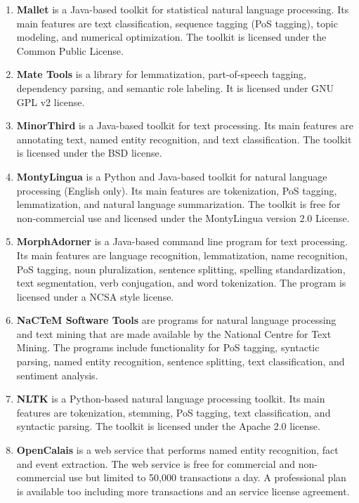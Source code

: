 \begin{enumerate}
	\item \textbf{Mallet} \cite{mccallum2002mallet} is a Java-based toolkit for statistical natural language processing. Its main features are text classification, sequence tagging (PoS tagging), topic modeling, and numerical optimization.
The toolkit is licensed under the Common Public License.

	\item \textbf{Mate Tools} \cite{mateTools} is a library for lemmatization, part-of-speech tagging, dependency parsing, and semantic role labeling. It is licensed under GNU GPL v2 license.

	\item \textbf{MinorThird} \cite{cohen2004minorthird} is a Java-based toolkit for text processing. Its main features are annotating text, named entity recognition, and text classification.
The toolkit is licensed under the BSD license.

	\item \textbf{MontyLingua} \cite{liu2004montylingua} is a Python and Java-based toolkit for natural language processing (English only). Its main features are tokenization, PoS tagging, lemmatization, and natural language summarization.
The toolkit is free for non-commercial use and licensed under the MontyLingua version 2.0 License.

	\item \textbf{MorphAdorner} \cite{morphadorner} is a Java-based command line program for text processing. Its main features are language recognition, lemmatization, name recognition, PoS tagging, noun pluralization, sentence splitting, spelling standardization, text segmentation, verb conjugation, and word tokenization.
The program is licensed under a NCSA style license.

	\item \textbf{NaCTeM Software Tools} \cite{nactem} are programs for natural language processing and text mining that are made available by the National Centre for Text Mining. The programs include functionality for PoS tagging, syntactic parsing, named entity recognition, sentence splitting, text classification, and sentiment analysis.

	\item \textbf{NLTK} \cite{loper2002nltk} is a Python-based natural language processing toolkit. Its main features are tokenization, stemming, PoS tagging, text classification, and syntactic parsing.
The toolkit is licensed under the Apache 2.0 license.

	\item \textbf{OpenCalais} \cite{opencalais} is a web service that performs named entity recognition, fact and event extraction.
The web service is free for commercial and non-commercial use but limited to 50,000 transactions a day. A professional plan is available too including more transactions and an service license agreement.


\end{enumerate}
